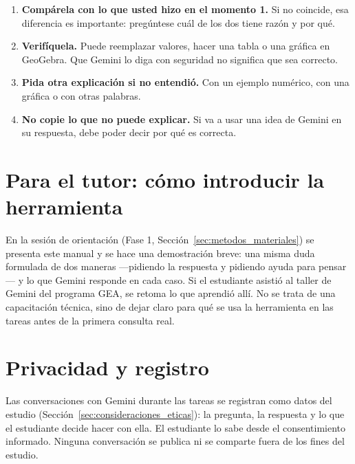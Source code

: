 \begin{enumerate}
\item \textbf{Compárela con lo que usted hizo en el momento 1.} Si no coincide, esa diferencia es importante: pregúntese cuál de los dos tiene razón y por qué.
\item \textbf{Verifíquela.} Puede reemplazar valores, hacer una tabla o una gráfica en GeoGebra. Que Gemini lo diga con seguridad no significa que sea correcto.
\item \textbf{Pida otra explicación si no entendió.} Con un ejemplo numérico, con una gráfica o con otras palabras.
\item \textbf{No copie lo que no puede explicar.} Si va a usar una idea de Gemini en su respuesta, debe poder decir por qué es correcta.
\end{enumerate}

\section*{Para el tutor: cómo introducir la herramienta}

En la sesión de orientación (Fase 1, Sección~\ref{sec:metodos_materiales}) se presenta este manual y se hace una demostración breve: una misma duda formulada de dos maneras ---pidiendo la respuesta y pidiendo ayuda para pensar--- y lo que Gemini responde en cada caso. Si el estudiante asistió al taller de Gemini del programa GEA, se retoma lo que aprendió allí. No se trata de una capacitación técnica, sino de dejar claro para qué se usa la herramienta en las tareas antes de la primera consulta real.

\section*{Privacidad y registro}

Las conversaciones con Gemini durante las tareas se registran como datos del estudio (Sección~\ref{sec:consideraciones_eticas}): la pregunta, la respuesta y lo que el estudiante decide hacer con ella. El estudiante lo sabe desde el consentimiento informado. Ninguna conversación se publica ni se comparte fuera de los fines del estudio.
